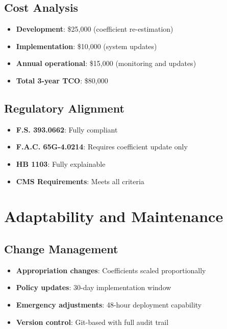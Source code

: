 \subsection{Cost Analysis}

\begin{itemize}
    \item \textbf{Development}: \$25,000 (coefficient re-estimation)
    \item \textbf{Implementation}: \$10,000 (system updates)
    \item \textbf{Annual operational}: \$15,000 (monitoring and updates)
    \item \textbf{Total 3-year TCO}: \$80,000
\end{itemize}

\subsection{Regulatory Alignment}

\begin{itemize}
    \item[\greencheck] \textbf{F.S. 393.0662}:   Fully compliant
    \item[\greencheck] \textbf{F.A.C. 65G-4.0214}:  Requires coefficient update only
    \item[\greencheck] \textbf{HB 1103}:  Fully explainable
    \item[\greencheck] \textbf{CMS Requirements}:  Meets all criteria
\end{itemize}

\section{Adaptability and Maintenance}

\subsection{Change Management}

\begin{itemize}
    \item \textbf{Appropriation changes}: Coefficients scaled proportionally
    \item \textbf{Policy updates}: 30-day implementation window
    \item \textbf{Emergency adjustments}: 48-hour deployment capability
    \item \textbf{Version control}: Git-based with full audit trail
\end{itemize}

